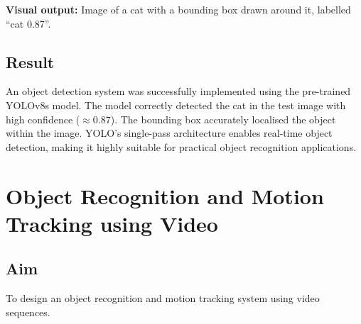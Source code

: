 \documentclass[12pt,a4paper]{article}
\begin{document}
\noindent \textbf{Visual output:} Image of a cat with a bounding box drawn around it,
labelled ``cat 0.87''.

\subsection*{Result}
An object detection system was successfully implemented using the pre-trained YOLOv8s model.
The model correctly detected the cat in the test image with high confidence ($\approx 0.87$).
The bounding box accurately localised the object within the image. YOLO's single-pass
architecture enables real-time object detection, making it highly suitable for practical
object recognition applications.

\newpage

\section{Object Recognition and Motion Tracking using Video}

\subsection*{Aim}
To design an object recognition and motion tracking system using video sequences.
\end{document}
